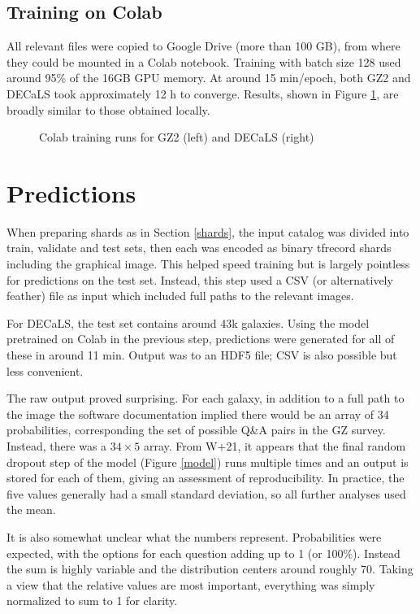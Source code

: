 \documentclass[preprint]{aastex631}
\begin{document}
\subsection{Training on Colab} \label{sec:colabtrain}

All relevant files were copied to Google Drive (more than 100 GB), from where they could be mounted in a Colab notebook. Training with batch size 128 used around 95\% of the 16GB GPU memory. At around 15 min/epoch, both GZ2 and DECaLS took approximately 12 h to converge. Results, shown in Figure \ref{fig:train_colab}, are broadly similar to those obtained locally.

\begin{figure}
	\caption{Colab training runs for GZ2 (left) and DECaLS (right) \label{fig:train_colab}}
\end{figure}


\section{Predictions} \label{sec:predictions}

When preparing shards as in Section \ref{shards}, the input catalog was divided into train, validate and test sets, then each was encoded as binary tfrecord shards including the graphical image. This helped speed training but is largely pointless for predictions on the test set. Instead, this step used a CSV (or alternatively feather) file as input which included full paths to the relevant images.

For DECaLS, the test set contains around 43k galaxies. Using the model pretrained on Colab in the previous step, predictions were generated for all of these in around 11 min. Output was to an HDF5 file; CSV is also possible but less convenient.

The raw output proved surprising. For each galaxy, in addition to a full path to the image the software documentation implied there would be an array of 34 probabilities, corresponding the set of possible Q\&A pairs in the GZ survey. Instead, there was a $34 \times 5$ array. From W+21, it appears that the final random dropout step of the model (Figure \ref{model}) runs multiple times and an output is stored for each of them, giving an assessment of reproducibility. In practice, the five values generally had a small standard deviation, so all further analyses used the mean.

It is also somewhat unclear what the numbers represent. Probabilities were expected, with the options for each question adding up to 1 (or  100\%). Instead the sum is highly variable and the distribution centers around roughly 70. Taking a view that the relative values are most important, everything was simply normalized to sum to 1 for clarity. 
\end{document}
